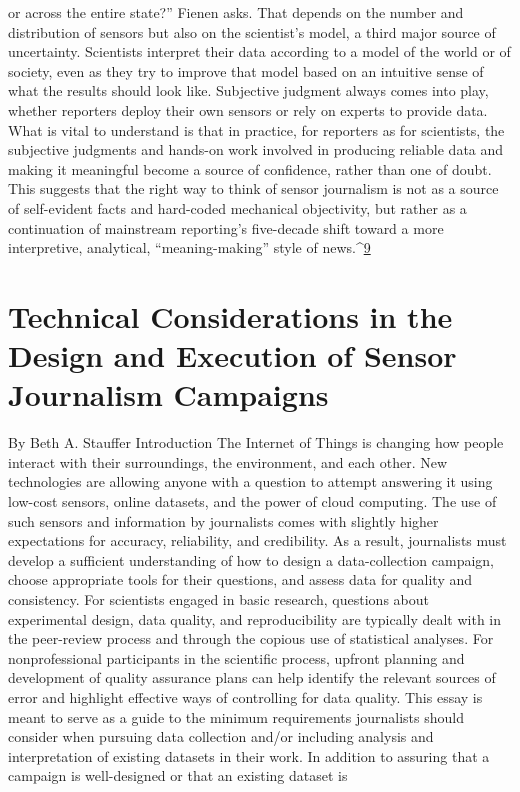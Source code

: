 \begin{itemize}
or across the entire state?'' Fienen asks. That depends on the number and
distribution of sensors but also on the scientist's model, a third major source
of uncertainty. Scientists interpret their data according to a model of the
world or of society, even as they try to improve that model based on an
intuitive sense of what the results should look like.
Subjective judgment always comes into play, whether reporters deploy their
own sensors or rely on experts to provide data. What is vital to understand
is that in practice, for reporters as for scientists, the subjective judgments
and hands-on work involved in producing reliable data and making it meaningful
become a source of confidence, rather than one of doubt. This suggests
that the right way to think of sensor journalism is not as a source of
self-evident facts and hard-coded mechanical objectivity, but rather as a
continuation of mainstream reporting's five-decade shift toward a more
interpretive, analytical, ``meaning-making'' style of news.^{\href{#endnotes-graves}{9}}

\section{Technical Considerations in the Design and Execution of Sensor Journalism Campaigns}
By Beth A. Stauffer
Introduction
The Internet of Things is changing how people interact with their surroundings,
the environment, and each other. New technologies are allowing anyone
with a question to attempt answering it using low-cost sensors, online
datasets, and the power of cloud computing. The use of such sensors and
information by journalists comes with slightly higher expectations for accuracy,
reliability, and credibility. As a result, journalists must develop a sufficient
understanding of how to design a data-collection campaign, choose
appropriate tools for their questions, and assess data for quality and consistency.
For scientists engaged in basic research, questions about experimental
design, data quality, and reproducibility are typically dealt with in
the peer-review process and through the copious use of statistical analyses.
For nonprofessional participants in the scientific process, upfront planning
and development of quality assurance plans can help identify the relevant
sources of error and highlight effective ways of controlling for data quality.
This essay is meant to serve as a guide to the minimum requirements journalists
should consider when pursuing data collection and/or including
analysis and interpretation of existing datasets in their work. In addition
to assuring that a campaign is well-designed or that an existing dataset is


\end{itemize}
